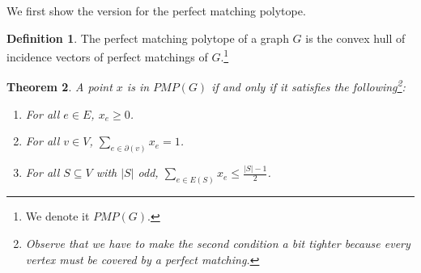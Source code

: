 \documentclass{tufte-handout}
\newtheorem{thm}{Theorem}
\theoremstyle{definition}
\newtheorem{defn}[thm]{Definition}
\theoremstyle{remark}
\begin{document}
We first show the version for the perfect matching polytope.

\begin{defn}
	The perfect matching polytope of a graph $G$ is the convex hull of incidence vectors of perfect matchings of $G$.\footnote{We denote it $PMP(G)$.}
\end{defn}

\begin{thm}\label{edmondsperfect}
	A point $x$ is in $PMP(G)$ if and only if it satisfies the following\footnote{Observe that we have to make the second condition a bit tighter because every vertex must be covered by a perfect matching.
	}:
	\begin{enumerate}
		\item For all $e \in E$, $x_e \geq 0$.
		\item For all $v \in V$, $\sum_{e \in \partial(v)} x_e = 1$.
		\item For all $S \subseteq V$ with $|S|$ odd, $\sum_{e \in E(S)} x_e \leq \frac{|S|-1}{2}$.
	\end{enumerate}
\end{thm}
\end{document}
